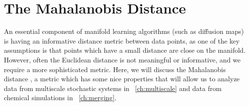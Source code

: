 %
%


\section{The Mahalanobis Distance}
\label{sec:mahalanobis}

An essential component of manifold learning algorithms (such as diffusion maps) is having an informative distance metric between data points, as one of the key assumptions is that points which have a small distance are close on the manifold.
%
However, often the Euclidean distance is not meaningful or informative, and we require a more sophisticated metric.
%
Here, we will discuss the Mahalanobis distance \cite{mahalanobis1936generalized}, a metric which has some nice properties that will allow us to analyze data from multiscale stochastic systems in \chap~\ref{ch:multiscale} and data from chemical simulations in \chap~\ref{ch:merging}.

